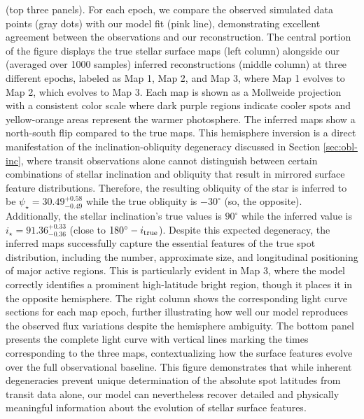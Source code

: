\documentclass[twocolumn]{aastex631}
\begin{document}
(top three panels). For each epoch, we compare the observed simulated data points (gray dots) with our model fit (pink line), 
demonstrating excellent agreement between the observations and our reconstruction.
The central portion of the figure displays the true stellar surface maps (left column) alongside our (averaged over 1000 samples) 
inferred reconstructions 
(middle column) at three different epochs, labeled as Map 1, Map 2, and Map 3, where Map 1 evolves to Map 2, which evolves to Map 3. 
Each map is shown as a Mollweide projection with a consistent color scale where dark purple regions indicate cooler spots and 
yellow-orange areas represent the warmer photosphere. The inferred maps show a north-south flip compared to the true maps. 
This hemisphere inversion is a direct manifestation of the inclination-obliquity degeneracy discussed in Section \ref{sec:obl-inc}, 
where transit observations alone cannot distinguish between certain combinations of stellar inclination and obliquity that result 
in mirrored surface feature distributions. Therefore, the resulting obliquity of the star is inferred to be 
$\psi_\star=30.49^{+0.58}_{-0.49}$ while the true obliquity is $-30^\circ$ (so, the opposite). 
Additionally, the stellar inclination's true 
values is $90^\circ$ while the inferred value is $i_\star=91.36^{+0.33}_{-0.36}$ (close to $180^\circ-i_{\rm true}$).
Despite this expected degeneracy, the inferred maps successfully capture the essential features of the true spot distribution, 
including the number, approximate size, and longitudinal positioning of major active regions. This is particularly evident in 
Map 3, where the model correctly identifies a prominent high-latitude bright region, though it places it in the opposite 
hemisphere.
The right column shows the corresponding light curve sections for each map epoch, further illustrating how well our model 
reproduces the observed flux variations despite the hemisphere ambiguity. The bottom panel presents the complete light curve 
with vertical lines marking the times corresponding to the three maps, contextualizing how the surface features evolve over the 
full observational baseline.
This figure demonstrates that while inherent degeneracies prevent unique determination of the absolute spot latitudes from 
transit data alone, our model can nevertheless recover detailed and physically meaningful information about the evolution of 
stellar surface features.
%
\end{document}

